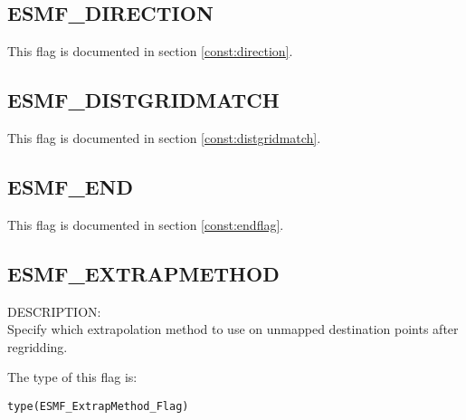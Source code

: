 \subsection{ESMF\_DIRECTION}
This flag is documented in section \ref{const:direction}.

\subsection{ESMF\_DISTGRIDMATCH}
This flag is documented in section \ref{const:distgridmatch}.

\subsection{ESMF\_END}

This flag is documented in section \ref{const:endflag}.

\subsection{ESMF\_EXTRAPMETHOD}
\label{opt:extrapmethod}

{\sf DESCRIPTION:\\}  
Specify which extrapolation method to use on unmapped destination points after regridding. 

The type of this flag is:

{\tt type(ESMF\_ExtrapMethod\_Flag)}

